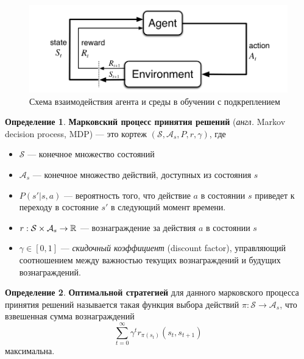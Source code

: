\documentclass[specification,annotation,times]{itmo-student-thesis}
\theoremstyle{definition}
\newtheorem{definition-ru}{Определение}
\begin{document}
\begin{figure}[!h]
  \caption{Схема взаимодействия агента и среды в обучении с подкреплением}\label{rl-scheme}
  \centering
  \includegraphics[scale=0.5]{rl-scheme}
\end{figure}

\begin{definition-ru}
  \textbf{Марковский процесс принятия решений} (\textit{англ.} Markov decision process, MDP) ---
  это кортеж
  $(\mathcal{S}, \mathcal{A}_s, P, r, \gamma)$, где

  \begin{itemize}
  \item $\mathcal{S}$ --- конечное множество состояний
  \item $\mathcal{A}_s$ --- конечное множество действий, доступных из состояния
    $s$
  \item $P(s' | s, a)$ --- вероятность того, что действие $a$ в состоянии $s$
    приведет к переходу в состояние $s'$ в следующий момент времени.
  \item $r : \mathcal{S} \times \mathcal{A}_s \rightarrow \Bbb{R}$ ---
    вознаграждение за действия $a$ в состоянии $s$
  \item $\gamma \in [0, 1]$ --- \textit{скидочный коэффициент} (discount factor),
    управляющий соотношением между важностью текущих вознаграждений и будущих вознаграждений.
  \end{itemize}
\end{definition-ru}

\begin{definition-ru}
  \textbf{Оптимальной стратегией} для данного марковского процесса принятия
  решений называется такая функция выбора действий $\pi : \mathcal{S} \rightarrow \mathcal{A}_s$,
  что взвешенная сумма вознаграждений
  \begin{equation}\label{eq:reward-sum}
    \sum\limits_{t=0}^{\infty} {\gamma^t r_{\pi(s_t)}(s_t, s_{t+1})}
  \end{equation}
  максимальна.
\end{definition-ru}
\end{document}
